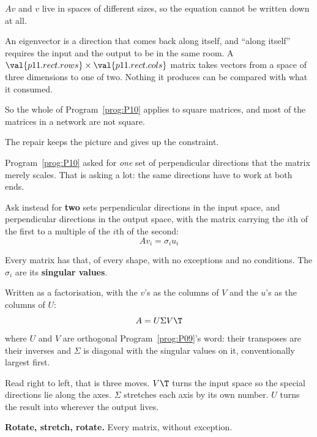 \begin{fr}
\begin{ansblock}
$Av$ and $v$ live in spaces of different sizes, so the equation cannot be
written down at all.
\end{ansblock}

An eigenvector is a direction that comes back along itself, and \enquote{along
itself} requires the input and the output to be in the same room. A
$\val{p11.rect.rows} \times \val{p11.rect.cols}$ matrix takes vectors from a
space of three dimensions to one of two. Nothing it produces can be compared
with what it consumed.

So the whole of Program~\ref{prog:P10} applies to square matrices, and most of
the matrices in a network are not square.
\end{fr}

\begin{fr}
The repair keeps the picture and gives up the constraint.

Program~\ref{prog:P10} asked for \emph{one} set of perpendicular directions
that the matrix merely scales. That is asking a lot: the same directions have
to work at both ends.

Ask instead for \textbf{two} sets \dash{} perpendicular directions in the input
space, and perpendicular directions in the output space, with the matrix
carrying the $i$th of the first to a multiple of the $i$th of the second:
\[ Av_i = \sigma_i u_i \]

Every matrix has that, of every shape, with no exceptions and no conditions.
The $\sigma_i$ are its \textbf{singular values}.
\end{fr}

\begin{fr}
Written as a factorisation, with the $v$'s as the columns of $V$ and the $u$'s
as the columns of $U$:
\[ A = U\Sigma V\T \]
where $U$ and $V$ are orthogonal \dash{} Program~\ref{prog:P09}'s word: their
transposes are their inverses \dash{} and $\Sigma$ is diagonal with the
singular values on it, conventionally largest first.

Read right to left, that is three moves. $V\T$ turns the input space so the
special directions lie along the axes. $\Sigma$ stretches each axis by its own
number. $U$ turns the result into wherever the output lives.

\textbf{Rotate, stretch, rotate.} Every matrix, without exception.
\end{fr}


